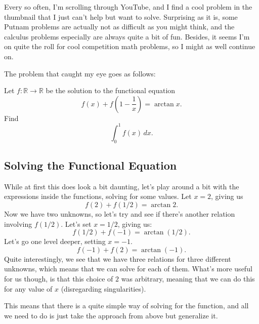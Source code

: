 Every so often, I'm scrolling through YouTube, and I find a cool problem in the
thumbnail that I just can't help but want to solve. Surprising as it is, some
Putnam problems are actually not as difficult as you might think, and the
calculus problems especially are always quite a bit of fun. Besides, it seems
I'm on quite the roll for cool competition math problems, so I might as well
continue on.

The problem that caught my eye goes as follows:

\begin{blackbox}
    \begin{problem}
        Let \( f \colon \mathbb{R} \to \mathbb{R} \) be the solution to the functional equation
        \[
            f \left( x \right) + f \left( 1 - \frac{1}{x}  \right) = \arctan{x}
        .\]
        Find
        \[
            \int_{ 0 }^{ 1 } f \left( x \right) \, dx
        .\]
    \end{problem}
\end{blackbox}

\subsection{Solving the Functional Equation}

While at first this does look a bit daunting, let's play around a bit with the
expressions inside the functions, solving for some values. Let \( x = 2 \), giving us
\[
    f \left( 2 \right) + f \left( 1/2 \right) = \arctan{2}
.\]
Now we have two unknowns, so let's try and see if there's another relation involving \( f \left( 1/2 \right) \). Let's set \( x = 1/2 \), giving us:
\[
    f \left( 1/2 \right) + f \left( -1 \right) = \arctan{\left( 1/2 \right)}
.\]
Let's go one level deeper, setting \( x = -1 \).
\[
    f \left( -1 \right) + f \left( 2 \right) = \arctan{\left(-1 \right)}
.\]
Quite interestingly, we see that we have three relations for three different
unknowns, which means that we can solve for each of them. What's more useful
for us though, is that this choice of \( 2 \) was arbitrary, meaning that we
can do this for any value of \( x \) (disregarding singularities).

This means that there is a quite simple way of solving for the function, and all we need to do is just take the approach from above but generalize it.

